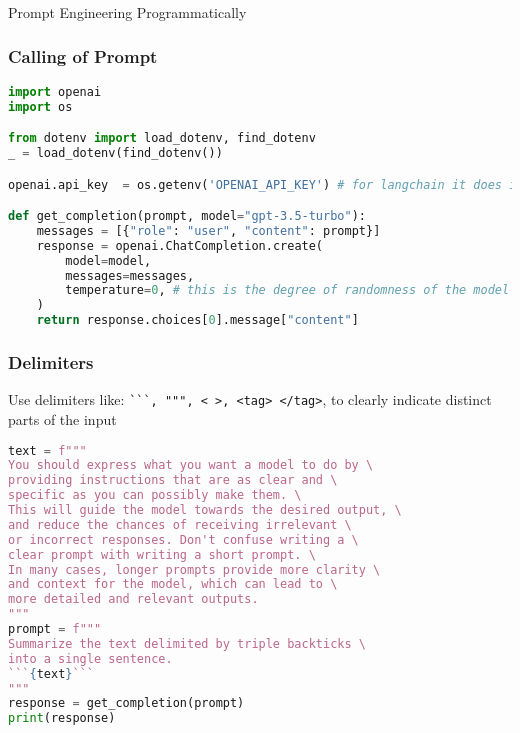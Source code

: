 \begin{frame}[fragile]\frametitle{}
\begin{center}
{\Large Prompt Engineering Programmatically}
\end{center}
\end{frame}


\begin{frame}[fragile]\frametitle{Calling of Prompt}

\begin{lstlisting}[language=Python]
import openai
import os

from dotenv import load_dotenv, find_dotenv
_ = load_dotenv(find_dotenv())

openai.api_key  = os.getenv('OPENAI_API_KEY') # for langchain it does it automatically

def get_completion(prompt, model="gpt-3.5-turbo"):
    messages = [{"role": "user", "content": prompt}]
    response = openai.ChatCompletion.create(
        model=model,
        messages=messages,
        temperature=0, # this is the degree of randomness of the model's output
    )
    return response.choices[0].message["content"]
\end{lstlisting}
		
\end{frame}


\begin{frame}[fragile]\frametitle{Delimiters}

Use delimiters like: \lstinline|```, """, < >, <tag> </tag>|,  to clearly indicate distinct parts of the input

\begin{lstlisting}[language=Python]
text = f"""
You should express what you want a model to do by \ 
providing instructions that are as clear and \ 
specific as you can possibly make them. \ 
This will guide the model towards the desired output, \ 
and reduce the chances of receiving irrelevant \ 
or incorrect responses. Don't confuse writing a \ 
clear prompt with writing a short prompt. \ 
In many cases, longer prompts provide more clarity \ 
and context for the model, which can lead to \ 
more detailed and relevant outputs.
"""
prompt = f"""
Summarize the text delimited by triple backticks \ 
into a single sentence.
```{text}```
"""
response = get_completion(prompt)
print(response)
\end{lstlisting}
		
		
\end{frame}

